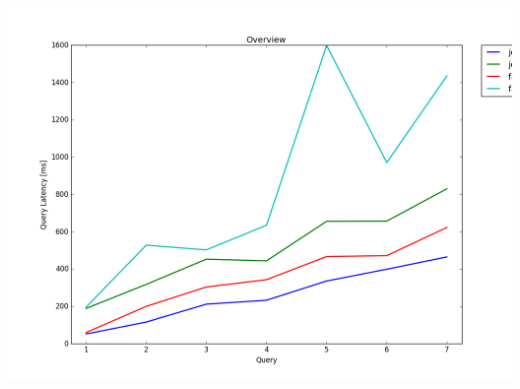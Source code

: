 \documentclass[11pt,singlecolumn]{scrartcl}
\begin{document}
\includegraphics[width=1\textwidth]{overview3}

\clearpage

\clearpage
\end{document}
